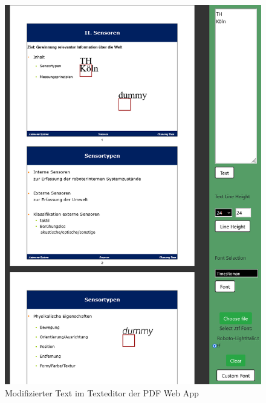 \begin{figure}[!htbp]
	\centering
	\includegraphics[width=1\textwidth]{"images/texteditor3.png"}
	\caption{Modifizierter Text im Texteditor der PDF Web App}
	\label{fig:texteditor3}
\end{figure}

